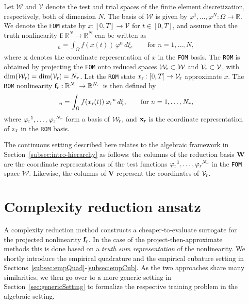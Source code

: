 \documentclass[onefignum,onetabnum]{siamart251104}
\newcommand{\bv}[1]{{\mathbf #1}}
\newcommand{\bt}[1]{{\mathbf{#1}}}
\newcommand{\funSpace}[1]{\mathcal{#1}}
\newcommand{\rom}[1]{{{#1}_{\rm{r}}}}
\newcommand{\Nr}{{N_r}}
\newcommand{\R}{\mathbb{R}}
\newcommand{\ffun}{{\bv{f}}}
\newcommand{\tL}{{\fs{\varphi}}}
\newcommand{\fs}[1]{{{#1}}} %
\newcommand{\xp}{{\xi}} %
\newcommand{\acro}[1]{{\texttt{#1}}}  %
\newcommand{\mydim}[1]{{\textrm{dim}#1}}  %
\begin{document}
Let $\funSpace{W}$ and $\funSpace{V}$ denote the test and trial spaces of the finite element discretization, respectively, both of dimension $N$. The basis of $\funSpace{W}$ is given by $\tL^1,\ldots,\tL^N: \Omega \to \R$.
We denote the \acro{FOM} state by $\fs{x}: [0,T] \to \funSpace{V}$ for $t \in [0,T]$, and assume that the truth nonlinearity ${\bt{f}}: \R^N \to \R^N$ can be written as
\begin{align*}
[\ffun(\bv{x}(t))]_n = \int_\Omega f(\fs{x}(t)) \, \tL^n \, d\xp, \qquad \text{for } n = 1,\ldots,N,
\end{align*}
where $\bv{x}$ denotes the coordinate representation of $\fs{x}$ in the \acro{FOM} basis.
The \acro{ROM} is obtained by projecting the \acro{FOM} onto reduced spaces $\rom{\funSpace{W}} \subset \funSpace{W}$ and $\rom{\funSpace{V}} \subset \funSpace{V}$, with $\mydim(\rom{\funSpace{W}}) = \mydim(\rom{\funSpace{V}}) = \Nr$. Let the \acro{ROM} state $\rom{\fs{x}}: [0,T] \to \rom{\funSpace{V}}$ approximate $\fs{x}$. The \acro{ROM} nonlinearity $\rom{\bt{f}}: \R^\Nr \to \R^\Nr$ is then defined by
\begin{align*}
[\rom{\ffun}(\rom{\bv{x}}(t))]_n = \int_\Omega f(\rom{\fs{x}}(t)) \, \rom{\tL}^n \, d\xp, \qquad \text{for } n = 1,\ldots,\Nr,
\end{align*}
where $\rom{\tL}^1,\ldots,\rom{\tL}^\Nr$ form a basis of $\rom{\funSpace{W}}$, and $\rom{\bv{x}}$ is the coordinate representation of $\rom{\fs{x}}$ in the \acro{ROM} basis.
\begin{rmrk} \label{rem:coordRepresDyn}
The continuous setting described here relates to the algebraic framework in Section~\ref{subsec:intro-hierarchy} as follows: the columns of the reduction basis $\bt{W}$ are the coordinate representations of the test functions $\rom{\tL}^1,\dots,\rom{\tL}^\Nr$ in the \acro{FOM} space $\funSpace{W}$.  Likewise, the columns of $\bt{V}$ represent the coordinates of $\rom{\funSpace{V}}$.
\end{rmrk}

\section{Complexity reduction ansatz} \label{sec:ansatzEquadCub}
A complexity reduction method constructs a cheaper-{\-}to-{\-}evaluate surrogate for the projected nonlinearity $\rom{\ffun}$. In the case of the project-then-approximate methods this is done based on a \textit{truth sum representation} of the nonlinearity. We shortly introduce the empirical quadrature and the empirical cubature setting in Sections~\ref{subsec:empQuad}-\ref{subsec:empCub}. As the two approaches share many similarities, we then go over to a more generic setting in Section~\ref{sec:genericSetting} to formalize the respective training problem in the algebraic setting.
\end{document}
